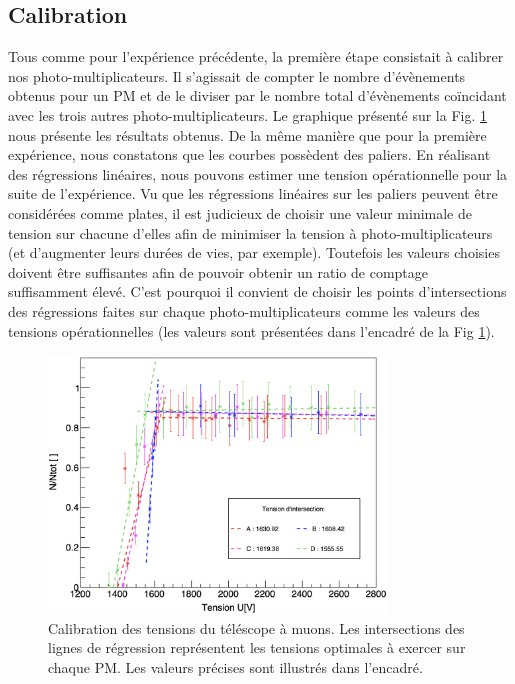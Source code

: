 \documentclass[12pt]{article}
\begin{document}

\subsection{Calibration}

Tous comme pour l'expérience précédente, la première étape consistait à calibrer nos photo-multiplicateurs. Il s'agissait de compter le nombre d'évènements obtenus pour un PM et de le diviser par le nombre total d'évènements coïncidant avec les trois autres photo-multiplicateurs.  Le graphique présenté sur la Fig. \ref{fig:Graph_calib_exp_2} nous présente les résultats obtenus. 
De la même manière que pour la première expérience, nous constatons que les courbes possèdent des paliers. En réalisant des régressions linéaires, nous pouvons estimer une tension opérationnelle pour la suite de l'expérience. Vu que les régressions linéaires sur les paliers peuvent être considérées comme plates, il est judicieux de choisir une valeur minimale de tension sur chacune d'elles afin de minimiser la tension à photo-multiplicateurs (et d'augmenter leurs durées de vies, par exemple). Toutefois les valeurs choisies doivent être suffisantes afin de pouvoir obtenir un ratio de comptage suffisamment élevé. C'est pourquoi il convient de choisir les points d'intersections des régressions faites sur chaque photo-multiplicateurs comme les valeurs des tensions opérationnelles (les valeurs sont présentées dans l'encadré de la Fig \ref{fig:Graph_calib_exp_2}).

\begin{figure}[htpb!]
    \centering
    \includegraphics[width=0.8\textwidth]{graphiques/experience2/calibration_exp_2.png}
    \caption{Calibration des tensions du téléscope à muons. Les intersections des lignes de régression représentent les tensions optimales à exercer sur chaque PM. Les valeurs précises sont illustrés dans l'encadré.}
    \label{fig:Graph_calib_exp_2}
\end{figure}
\end{document}
